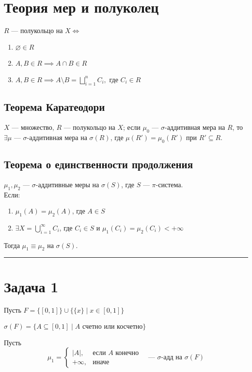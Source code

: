 \documentclass[12pt, a4paper]{article}
\newcommand{\card}[1]{\left| #1 \right|}
\begin{document}
\section*{Теория мер и полуколец}

$R$ --- полукольцо на $X \iff$ 
\begin{enumerate}
    \item $\varnothing \in R$
    \item $A, B \in R \implies A \cap B \in R$
    \item $A, B \in R \implies A \setminus B = \bigsqcup\limits_{i=1}^n C_i, \text{ где } C_i \in R$
\end{enumerate}

\subsection*{Теорема Каратеодори}
$X$ --- множество, $R$ --- полукольцо на $X$; если $\mu_0$ --- $\sigma$-аддитивная мера на $R$, то $\exists \mu$ --- $\sigma$-аддитивная мера на $\sigma(R)$, где $\mu(R') = \mu_0(R')$ при $R' \subseteq R$.

\subsection*{Теорема о единственности продолжения}
$\mu_1, \mu_2$ --- $\sigma$-аддитивные меры на $\sigma(S)$, где $S$ --- $\pi$-система. \\
Если:
\begin{enumerate}
    \item $\mu_1(A) = \mu_2(A)$, где $A \in S$
    \item $\exists X = \bigcup\limits_{i=1}^\infty C_i$, где $C_i \in S$ и $\mu_1(C_i) = \mu_2(C_i) < +\infty$
\end{enumerate}
Тогда $\mu_1 \equiv \mu_2$ на $\sigma(S)$.

\bigskip
\hrule
\bigskip

\section*{Задача 1}

Пусть $F = \{ [0, 1] \} \cup \{ \{x\} \mid x \in [0, 1] \}$

$\sigma(F) = \{ A \subseteq [0, 1] \mid A \text{ счетно или косчетно} \}$

Пусть
\[
\mu_1 = 
\begin{cases}
\card{A}, & \text{если } A \text{ конечно} \\
+\infty, & \text{иначе}
\end{cases}
\quad \text{— } \sigma\text{-адд на } \sigma(F)
\]
\end{document}
